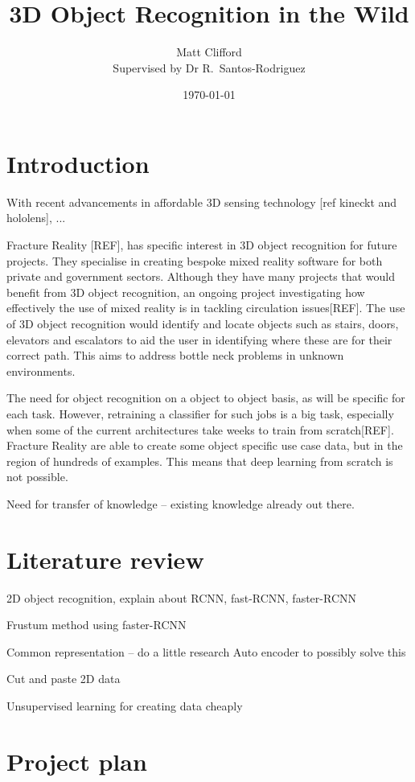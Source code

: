 \documentclass[11pt]{article}
\title{3D Object Recognition in the Wild}
\author{Matt Clifford \\ Supervised by Dr R.\ Santos-Rodriguez}
\date{\today}
\begin{document}
\maketitle

\section{Introduction}
With recent advancements in affordable 3D sensing technology [ref kineckt and hololens], ...

Fracture Reality [REF], has specific interest in 3D object recognition for future projects. They specialise in creating bespoke mixed reality software for both private and government sectors. Although they have many projects that would benefit from 3D object recognition, an ongoing project investigating how effectively the use of mixed reality is in tackling circulation issues[REF]. The use of 3D object recognition would identify and locate objects such as stairs, doors, elevators and escalators to aid the user in identifying where these are for their correct path. This aims to address bottle neck problems in unknown environments.

The need for object recognition on a object to object basis, as will be specific for each task. However, retraining a classifier for such jobs is a big task, especially when some of the current architectures take weeks to train from scratch[REF]. Fracture Reality are able to create some object specific use case data, but in the region of hundreds of examples. This means that deep learning from scratch is not possible.

Need for transfer of knowledge -- existing knowledge already out there.


\section{Literature review}
2D object recognition, explain about RCNN, fast-RCNN, faster-RCNN

Frustum method using faster-RCNN

Common representation -- do a little research
	Auto encoder to possibly solve this 

Cut and paste 2D data

Unsupervised learning for creating data cheaply


\section{Project plan}
\end{document}
